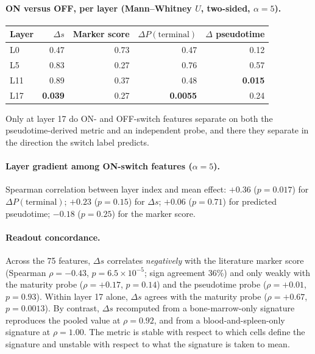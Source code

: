 \documentclass[10pt,letterpaper]{article}
\begin{document}
\paragraph{ON versus OFF, per layer (Mann--Whitney $U$, two-sided, $\alpha=5$).}

\begin{center}
\begin{tabular}{lrrrr}
\toprule
Layer & $\Delta s$ & Marker score & $\Delta P(\mathrm{terminal})$ & $\Delta$ pseudotime \\
\midrule
L0  & 0.47 & 0.73 & 0.47 & 0.12 \\
L5  & 0.83 & 0.27 & 0.76 & 0.57 \\
L11 & 0.89 & 0.37 & 0.48 & \textbf{0.015} \\
L17 & \textbf{0.039} & 0.27 & \textbf{0.0055} & 0.24 \\
\bottomrule
\end{tabular}
\end{center}

Only at layer 17 do ON- and OFF-switch features separate on both the pseudotime-derived metric and an independent probe, and there they separate in the direction the switch label predicts.

\paragraph{Layer gradient among ON-switch features ($\alpha=5$).} Spearman correlation between layer index and mean effect: $+0.36$ ($p=0.017$) for $\Delta P(\mathrm{terminal})$; $+0.23$ ($p=0.15$) for $\Delta s$; $+0.06$ ($p=0.71$) for predicted pseudotime; $-0.18$ ($p=0.25$) for the marker score.

\paragraph{Readout concordance.} Across the 75 features, $\Delta s$ correlates \emph{negatively} with the literature marker score (Spearman $\rho=-0.43$, $p=6.5\times10^{-5}$; sign agreement 36\%) and only weakly with the maturity probe ($\rho=+0.17$, $p=0.14$) and the pseudotime probe ($\rho=+0.01$, $p=0.93$). Within layer 17 alone, $\Delta s$ agrees with the maturity probe ($\rho=+0.67$, $p=0.0013$). By contrast, $\Delta s$ recomputed from a bone-marrow-only signature reproduces the pooled value at $\rho=0.92$, and from a blood-and-spleen-only signature at $\rho=1.00$. The metric is stable with respect to which cells define the signature and unstable with respect to what the signature is taken to mean.
\end{document}
